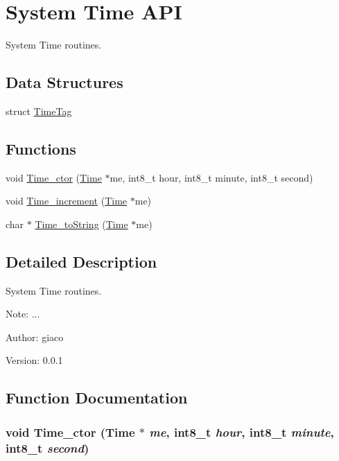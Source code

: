 \hypertarget{group___t_i_m_e_a_p_i}{
\section{System Time API}
\label{group___t_i_m_e_a_p_i}
}
System Time routines.  


\subsection*{Data Structures}
\begin{CompactItemize}
\item 
struct \hyperlink{struct_time_tag}{TimeTag}
\end{CompactItemize}
\subsection*{Functions}
\begin{CompactItemize}
\item 
void \hyperlink{group___t_i_m_e_a_p_i_g67bfcc9f80489905bbe4152f32cd7d59}{Time\_\-ctor} (\hyperlink{struct_time_tag}{Time} $\ast$me, int8\_\-t hour, int8\_\-t minute, int8\_\-t second)
\item 
void \hyperlink{group___t_i_m_e_a_p_i_g365e8c6d726ee14937fc0041c91c50aa}{Time\_\-increment} (\hyperlink{struct_time_tag}{Time} $\ast$me)
\item 
char $\ast$ \hyperlink{group___t_i_m_e_a_p_i_gbb031a679ff73e5c3a6ee651233e9c2c}{Time\_\-toString} (\hyperlink{struct_time_tag}{Time} $\ast$me)
\end{CompactItemize}


\subsection{Detailed Description}
System Time routines. 

\begin{Desc}
\item[Note:]... \end{Desc}
\begin{Desc}
\item[Author:]giaco \end{Desc}
\begin{Desc}
\item[Version:]0.0.1 \end{Desc}


\subsection{Function Documentation}
\hypertarget{group___t_i_m_e_a_p_i_g67bfcc9f80489905bbe4152f32cd7d59}{
\subsubsection[{Time\_\-ctor}]{\setlength{\rightskip}{0pt plus 5cm}void Time\_\-ctor ({\bf Time} $\ast$ {\em me}, \/  int8\_\-t {\em hour}, \/  int8\_\-t {\em minute}, \/  int8\_\-t {\em second})}}
\label{group___t_i_m_e_a_p_i_g67bfcc9f80489905bbe4152f32cd7d59}


